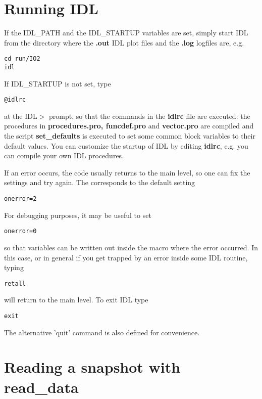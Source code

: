 \documentclass{article}
\begin{document}
\section{Running IDL \label{s-run-idl}}

   If the IDL\_PATH and the IDL\_STARTUP variables are set, simply 
   start IDL from the directory where the {\bf *.out} IDL plot files
   and the {\bf *.log} logfiles are, e.g.
\begin{verbatim}
cd run/IO2
idl
\end{verbatim}
   If IDL\_STARTUP is not set, type
\begin{verbatim}
@idlrc
\end{verbatim}
   at the IDL$>$ prompt, so that the commands in the {\bf idlrc} file are
   executed: 
   the procedures in {\bf procedures.pro, funcdef.pro} and 
   {\bf vector.pro} are compiled and 
   the script {\bf set\_defaults} is executed to set some
   common block variables to their default values. You can customize the startup
   of IDL by editing {\bf idlrc}, e.g. you can
   compile your own IDL procedures. 

   If an error occurs, the code usually returns to the main level, so one
   can fix the settings and try again. The corresponds to the default 
   setting
\begin{verbatim}
onerror=2
\end{verbatim}
   For debugging purposes, it may be useful to set 
\begin{verbatim}
onerror=0
\end{verbatim}
   so that variables can be written out inside the macro where the error
   occurred. In this case, or in general if you get trapped by an error 
   inside some IDL routine, typing
\begin{verbatim}
retall
\end{verbatim}
   will return to the main level. To exit IDL type
\begin{verbatim}
exit
\end{verbatim}
   The alternative 'quit' command is also defined for convenience.

\section{Reading a snapshot with read\_data \label{s-readdata}}
\end{document}

